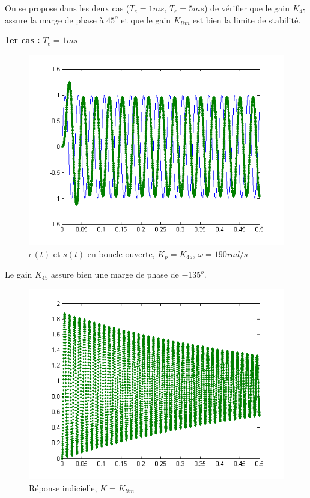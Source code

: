 \documentclass[../../Cours_M1.tex]{subfiles}
\begin{document}
On se propose dans les deux cas ($T_e=1ms$, $T_e=5ms$) de vérifier que le gain $K_{45}$ assure la marge de phase à $45^o$ et que le gain $K_{lim}$ est bien la limite de stabilité.

\bigskip
\textbf{1er cas :} $T_e = 1ms$

\begin{figure}[h!]
\centering
\includegraphics[scale=0.8]{m3retardpurTe1Kp45.png}
\caption{$e(t)$ et $s(t)$ en boucle ouverte, $K_p=K_{45}$, $\omega=190rad/s$}
\end{figure}

Le gain $K_{45}$ assure bien une marge de phase de $-135^o$.

\begin{figure}[h!]
\centering
\includegraphics[scale=0.8]{m3retardpurTe1.png}
\caption{Réponse indicielle, $K=K_{lim}$}
\end{figure}
\end{document}
